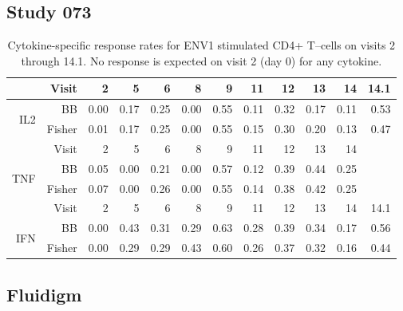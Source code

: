 \documentclass[11pt]{article}
\begin{document}
\subsection{Study 073}
\begin{table}[ht]
\begin{center}
\caption{Cytokine-specific response rates for ENV1 stimulated CD4+ T--cells on visits 2 through 14.1. No response is expected on visit 2 (day 0) for any cytokine.}\label{tab:positivityrates2}
\begin{tabular}{rrrrrrrrrrrr}
  \hline
&Visit & 2 & 5 & 6 & 8 & 9 & 11 & 12 & 13 & 14 & 14.1 \\ 
  \hline
\multirow{2}{*}{IL2}&BB & 0.00 & 0.17 & 0.25 & 0.00 & 0.55 & 0.11 & 0.32 & 0.17 & 0.11 & 0.53 \\ 
 &Fisher & 0.01 & 0.17 & 0.25 & 0.00 & 0.55 & 0.15 & 0.30 & 0.20 & 0.13 & 0.47 \\ 
   \hline
  \hline
&Visit & 2 & 5 & 6 & 8 & 9 & 11 & 12 & 13 & 14 \\ 
  \hline
\multirow{2}{*}{TNF}&BB & 0.05 & 0.00 & 0.21 & 0.00 & 0.57 & 0.12 & 0.39 & 0.44 & 0.25 \\ 
  &Fisher & 0.07 & 0.00 & 0.26 & 0.00 & 0.55 & 0.14 & 0.38 & 0.42 & 0.25 \\ 
   \hline
  \hline
 &Visit& 2 & 5 & 6 & 8 & 9 & 11 & 12 & 13 & 14 & 14.1 \\ 
  \hline
\multirow{2}{*}{IFN}&BB & 0.00 & 0.43 & 0.31 & 0.29 & 0.63 & 0.28 & 0.39 & 0.34 & 0.17 & 0.56 \\ 
  &Fisher & 0.00 & 0.29 & 0.29 & 0.43 & 0.60 & 0.26 & 0.37 & 0.32 & 0.16 & 0.44 \\ 
   \hline
\end{tabular}
\end{center}
\end{table}
\subsection{Fluidigm}
\end{document}

